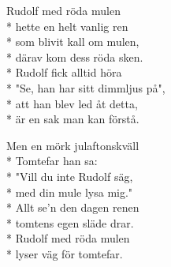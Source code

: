 \begin{SongText}
    \begin{SongVerse}
        Rudolf med röda mulen\\*%
        hette en helt vanlig ren\\*%
        som blivit kall om mulen,\\*%
        därav kom dess röda sken.\\*%
        Rudolf fick alltid höra\\*%
        "Se, han har sitt dimmljus på",\\*%
        att han blev led åt detta,\\*%
        är en sak man kan förstå.
    \end{SongVerse}
    \begin{SongVerse}
        Men en mörk julaftonskväll\\*%
        Tomtefar han sa:\\*%
        "Vill du inte Rudolf säg,\\*%
        med din mule lysa mig."\\*%
        Allt se'n den dagen renen\\*%
        tomtens egen släde drar.\\*%
        Rudolf med röda mulen\\*%
        lyser väg för tomtefar.
    \end{SongVerse}
\end{SongText}